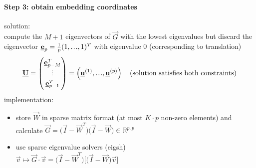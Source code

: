 \paragraph{Step 3: obtain embedding coordinates}
\vspace{-0.3cm}
solution: \\\vspace{0.2cm}
compute the $M+1$ eigenvectors of $\vec{G}$ with the lowest eigenvalues but discard the eigenvector $\vec{e}_p = \frac{1}{p} (1, \mydots, 1)^T$ with eigenvalue 0 (corresponding to translation) 
\vspace{-0.2cm}
\begin{equation*}
\vec{U} = \begin{pmatrix}
\vec{e}_{p-M}^T \\ \myvdots \\ \vec{e}_{p-1}^T
\end{pmatrix} = \left(\vec{u}^{(1)}, \mydots, \vec{u}^{(p)}\right) \quad \text{(solution satisfies both constraints)}
\end{equation*}
implementation:
\begin{itemize}
	\item store $\vec{W}$ in sparse matrix format (at most $K \cdot p$ non-zero elements) and calculate $\vec{G} = \Big( \vec{I} - \vec{W}^T \Big) \Big( \vec{I} - \vec{W} \Big) \in \mathbb{R}^{p,p}$ 
	\item use sparse eigenvalue solvers (eigsh) \\\vspace{0.1cm}$\vec{v} \mapsto \vec{G} \cdot \vec{v} = \Big( \vec{I} - \vec{W}^T \Big) \Big[ \Big( \vec{I} - \vec{W} \Big) \vec{v} \Big]$
\end{itemize}
